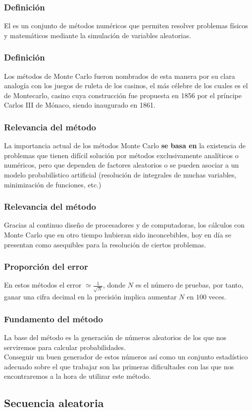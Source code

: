 \documentclass[12pt]{beamer}
\begin{document}
\begin{frame}
\frametitle{Definición}
El  es un conjunto de métodos numéricos que permiten resolver problemas físicos y matemáticos mediante la simulación de variables aleatorias.
\end{frame}
\begin{frame}
\frametitle{Definición}
Los métodos de Monte Carlo fueron nombrados de esta manera por su clara analogía con los juegos de ruleta de los casinos, el más célebre de los cuales es el de Montecarlo, casino cuya construcción fue propuesta en 1856 por el príncipe Carlos III de Mónaco, siendo inaugurado en 1861.
\end{frame}
\begin{frame}
\frametitle{Relevancia del método}
La importancia actual de los métodos Monte Carlo \textbf{se basa en} \pause la existencia de problemas que tienen difícil solución por métodos exclusivamente analíticos o numéricos, \pause pero que dependen de factores aleatorios o se pueden asociar a un modelo probabilístico artificial (resolución de integrales de muchas variables, minimización de funciones, etc.)
\end{frame}
\begin{frame}
\frametitle{Relevancia del método}
Gracias al continuo diseño de procesadores y de computadoras, los cálculos con Monte Carlo que en otro tiempo hubieran sido inconcebibles, hoy en día se presentan como asequibles para la resolución de ciertos problemas.
\end{frame}
\begin{frame}
 \frametitle{Proporción del error}
En estos métodos el error $\simeq \frac{1}{\sqrt{N}}$, donde $N$ es el número de pruebas, por tanto, ganar una cifra decimal en la precisión implica aumentar $N$ en $100$ veces.
\end{frame}
\begin{frame}
\frametitle{Fundamento del método}
La base del método es la generación de números aleatorios de los que nos serviremos para calcular probabilidades.
\\
\bigskip
\pause
Conseguir un buen generador de estos números así como un conjunto estadístico adecuado sobre el que trabajar son las primeras dificultades con las que nos encontraremos a la hora de utilizar este método.
\end{frame}

\subsection{Secuencia aleatoria}
\end{document}
